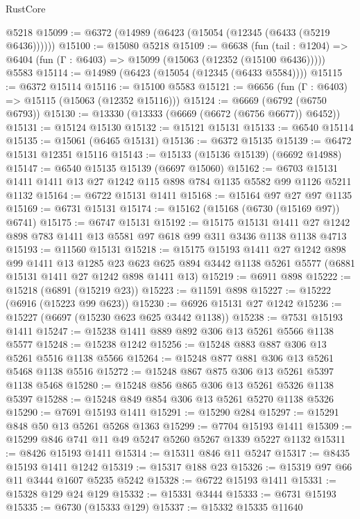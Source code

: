 \begin{lexlean}{RustCore}
\begin{coremodule}
    @5218
@15099 := @6372 (@14989 (@6423 (@15054 (@12345 (@6433 (@5219 @6436))))))
@15100 := @15080 @5218
@15109 := @6638
    (fun (tail : @1204) => @6404 (fun (Γ : @6403) => @15099 (@15063 (@12352 (@15100 @6436)))))
    @5583
@15114 := @14989 (@6423 (@15054 (@12345 (@6433 @5584))))
@15115 := @6372 @15114
@15116 := @15100 @5583
@15121 := @6656 (fun (Γ : @6403) => @15115 (@15063 (@12352 @15116)))
@15124 := @6669 (@6792 (@6750 @6793))
@15130 := @13330 (@13333 (@6669 (@6672 (@6756 @6677)) @6452))
@15131 := @15124 @15130
@15132 := @15121 @15131
@15133 := @6540 @15114
@15135 := @15061 (@6465 @15131)
@15136 := @6372 @15135
@15139 := @6472 @15131 @12351 @15116
@15143 := @15133 (@15136 @15139) (@6692 @14988)
@15147 := @6540 @15135 @15139 (@6697 @15060)
@15162 := @6703 @15131 @1411 @1411 @13 @27 @1242 @115 @898 @784 @1135 @5582 @99 @1126 @5211 @1132
@15164 := @6722 @15131 @1411
@15168 := @15164 @97 @27 @97 @1135
@15169 := @6731 @15131
@15174 := @15162 (@15168 (@6730 (@15169 @97)) @6741)
@15175 := @6747 @15131
@15192 := @15175
    @15131
    @1411
    @27
    @1242
    @898
    @783
    @1411
    @13
    @5581
    @97
    @618
    @99
    @311
    @3436
    @1138
    @1138
    @4713
@15193 := @11560 @15131
@15218 := @15175
    @15193
    @1411
    @27
    @1242
    @898
    @99
    @1411
    @13
    @1285
    @23
    @623
    @625
    @894
    @3442
    @1138
    @5261
    @5577
    (@6881 @15131 @1411 @27 @1242 @898 @1411 @13)
@15219 := @6911 @898
@15222 := @15218 (@6891 (@15219 @23))
@15223 := @11591 @898
@15227 := @15222 (@6916 (@15223 @99 @623))
@15230 := @6926 @15131 @27 @1242
@15236 := @15227 (@6697 (@15230 @623 @625 @3442 @1138))
@15238 := @7531 @15193 @1411
@15247 := @15238 @1411 @889 @892 @306 @13 @5261 @5566 @1138 @5577
@15248 := @15238 @1242
@15256 := @15248 @883 @887 @306 @13 @5261 @5516 @1138 @5566
@15264 := @15248 @877 @881 @306 @13 @5261 @5468 @1138 @5516
@15272 := @15248 @867 @875 @306 @13 @5261 @5397 @1138 @5468
@15280 := @15248 @856 @865 @306 @13 @5261 @5326 @1138 @5397
@15288 := @15248 @849 @854 @306 @13 @5261 @5270 @1138 @5326
@15290 := @7691 @15193 @1411
@15291 := @15290 @284
@15297 := @15291 @848 @50 @13 @5261 @5268 @1363
@15299 := @7704 @15193 @1411
@15309 := @15299 @846 @741 @11 @49 @5247 @5260 @5267 @1339 @5227 @1132
@15311 := @8426 @15193 @1411
@15314 := @15311 @846 @11 @5247
@15317 := @8435 @15193 @1411 @1242
@15319 := @15317 @188 @23
@15326 := @15319 @97 @66 @11 @3444 @1607 @5235 @5242
@15328 := @6722 @15193 @1411
@15331 := @15328 @129 @24 @129
@15332 := @15331 @3444
@15333 := @6731 @15193
@15335 := @6730 (@15333 @129)
@15337 := @15332 @15335 @11640

\end{coremodule}
\end{lexlean}
